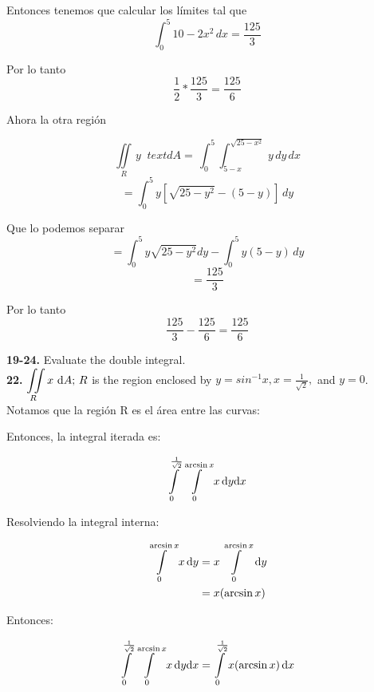 \documentclass[11pt]{report}
\begin{document}
Entonces tenemos que calcular los límites tal que
$$\int_{0}^{5} 10-2x^2\,dx = \frac{125}{3}$$

Por lo tanto
$$\frac{1}{2} * \frac{125}{3} = \frac{125}{6}$$


Ahora la otra región

$${\displaystyle \iint \limits_R } \, y \, \, \ text dA = \, \int_{0}^{5} \int_{5-x}^{\sqrt{25 - x^2}} \, y\,dy\,dx$$
$$ = \int_{0}^{5} y [\sqrt{25-y^2} - (5-y)] \, dy$$

Que lo podemos separar
$$ = \int_{0}^{5} y \sqrt{25-y^2} dy - \int_{0}^{5} y(5-y) \, dy $$
$$ = \frac{125}{3}$$

Por lo tanto
$$\frac{125}{3} - \frac{125}{6} = \frac{125}{6}$$



\textbf{19-24.} Evaluate the double integral. \\

\textbf{22.} $ {\displaystyle \iint \limits_R } \, x \, \, \text dA; \, R$ is the region
enclosed by $y = sin^{-1} x, x = \frac{1}{\sqrt{2}},$ and $y = 0$. \\

Notamos que la región R es el área entre las curvas:

\begin{figure}[h]
\centering
\end{figure}

Entonces, la integral iterada es:

\[ \int \limits_0^{\frac{1}{\sqrt{2}}} \int \limits_0^{\arcsin{x}} x \, \text dy \text dx \]

Resolviendo la integral interna:

\begin{equation}
\begin{split}
        \int \limits_0^{\arcsin{x}} x \, \text dy & =  x \int \limits_0^{\arcsin{x}} \, \text dy \\ \notag
        & = x (\arcsin{x})
\end{split}
\end{equation}

Entonces:

\begin{equation}
\begin{split}
        \int \limits_0^{\frac{1}{\sqrt{2}}}
        \int \limits_0^{\arcsin{x}} x \, \text dy \text dx &=
        \int \limits_0^{\frac{1}{\sqrt{2}}} x (\arcsin{x}) \, \text dx \\ \notag
\end{split}
\end{equation}
\end{document}
